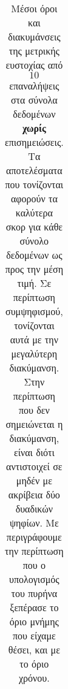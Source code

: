 \begin{table}[]
\begin{adjustbox}{angle=90}
{{\begin{tabular}{|l|c|c|c|c|c|c|}
\end{tabular}
}
}
\end{adjustbox}
\caption[Μέσοι όροι και διακυμάνσεις της μετρικής ευστοχίας από $10$ επαναλήψεις   στα σύνολα δεδομένων χωρίς επισημειώσεις.]{\small Μέσοι όροι και διακυμάνσεις της μετρικής ευστοχίας από $10$ επαναλήψεις   στα σύνολα δεδομένων \textbf{χωρίς} επισημειώσεις. Τα αποτελέσματα που τονίζονται αφορούν τα καλύτερα σκορ για κάθε σύνολο δεδομένων ως προς την μέση τιμή. Σε περίπτωση συμψηφισμού, τονίζονται αυτά με την μεγαλύτερη διακύμανση. Στην περίπτωση που δεν σημειώνεται η διακύμανση, είναι διότι αντιστοιχεί σε μηδέν με ακρίβεια δύο δυαδικών ψηφίων. Με  περιγράφουμε την περίπτωση που ο υπολογισμός του πυρήνα ξεπέρασε το όριο μνήμης που είχαμε θέσει, και με  το όριο χρόνου.}
\label{tab:acc:unlabelled}
\end{table}


